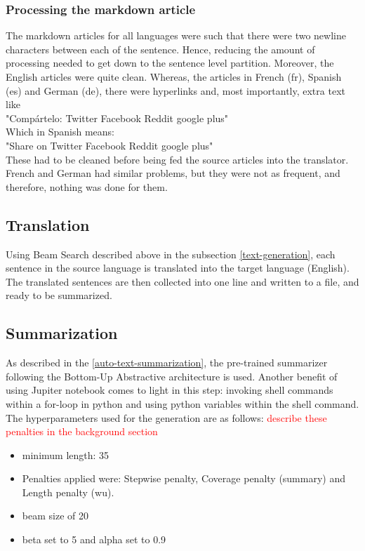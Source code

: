 \documentclass[12pt,a4paper,twoside,openright]{report}
\newcommand{\red}[1]{\textcolor{red}{#1}}
\newcommand{\changedFont}[1]{{\fontfamily{qcr}\selectfont #1}}
\begin{document}
\subsubsection{Processing the markdown article}
The markdown articles for all languages were such that there were two newline characters between each of the sentence. Hence, reducing the amount of processing needed to get down to the sentence level partition. Moreover, the English articles were quite clean. Whereas, the articles in French (fr), Spanish (es) and German (de), there were hyperlinks and, most importantly, extra text like \\
\changedFont{"Compártelo: Twitter Facebook Reddit google plus"}\\
Which in Spanish means: \\
\changedFont{"Share on Twitter Facebook Reddit google plus"}\\
These had to be cleaned before being fed the source articles into the translator. French and German had similar problems, but they were not as frequent, and therefore, nothing was done for them.

\subsection{Translation}
\label{translation}
Using Beam Search described above in the subsection \ref{text-generation}, each sentence in the source language is translated into the target language (English). The translated sentences are then collected into one line and written to a file, and ready to be summarized.

\subsection{Summarization}
\label{summarization}
As described in the \ref{auto-text-summarization}, the pre-trained summarizer following the Bottom-Up Abstractive architecture is used. Another benefit of using Jupiter notebook comes to light in this step: invoking shell commands within a for-loop in python and using python variables within the shell command. The hyperparameters used for the generation are as follows:
\red{describe these penalties in the background section}
\begin{itemize}
    \item minimum length: 35
    \item Penalties applied were: Stepwise penalty, Coverage penalty (summary) and Length penalty (wu).
    \item beam size of 20
    \item beta set to 5 and alpha set to 0.9
\end{itemize}
\end{document}
